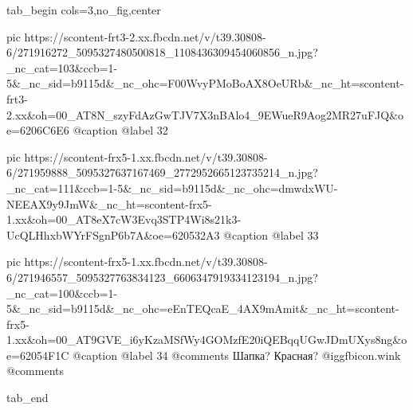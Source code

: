  
 
 
 
 


\ifcmt
  tab_begin cols=3,no_fig,center

     pic https://scontent-frt3-2.xx.fbcdn.net/v/t39.30808-6/271916272_5095327480500818_1108436309454060856_n.jpg?_nc_cat=103&ccb=1-5&_nc_sid=b9115d&_nc_ohc=F00WvyPMoBoAX8OeURb&_nc_ht=scontent-frt3-2.xx&oh=00_AT8N_szyFdAzGwTJV7X3nBAlo4_9EWueR9Aog2MR27uFJQ&oe=6206C6E6
     @caption @label 32

     pic https://scontent-frx5-1.xx.fbcdn.net/v/t39.30808-6/271959888_5095327637167469_2772952665123735214_n.jpg?_nc_cat=111&ccb=1-5&_nc_sid=b9115d&_nc_ohc=dmwdxWU-NEEAX9y9JmW&_nc_ht=scontent-frx5-1.xx&oh=00_AT8eX7cW3Evq3STP4Wi8s21k3-UcQLHhxbWYrFSgnP6b7A&oe=620532A3
     @caption @label 33

     pic https://scontent-frx5-1.xx.fbcdn.net/v/t39.30808-6/271946557_5095327763834123_6606347919334123194_n.jpg?_nc_cat=100&ccb=1-5&_nc_sid=b9115d&_nc_ohc=eEnTEQcaE_4AX9mAmit&_nc_ht=scontent-frx5-1.xx&oh=00_AT9GVE_i6yKzaMSfWy4GOMzfE20iQEBqqUGwJDmUXys8ng&oe=62054F1C
     @caption @label 34
     @comments%
Шапка? Красная? @igg{fbicon.wink} 
     @comments%

  tab_end
\fi
